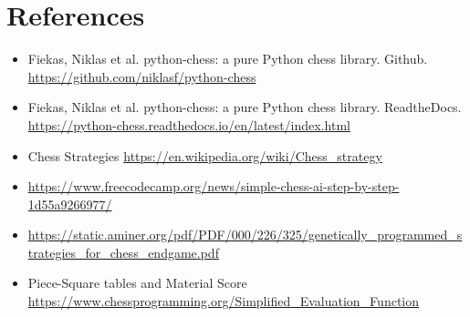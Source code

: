 \documentclass[12pt]{article}
\begin{document}
\section{References}
\label{References}
\begin{itemize}
\item Fiekas, Niklas et al. python-chess: a pure Python chess library. Github.
\url{https://github.com/niklasf/python-chess}

\item Fiekas, Niklas et al. python-chess: a pure Python chess library. ReadtheDocs.
\url{https://python-chess.readthedocs.io/en/latest/index.html }

\item Chess Strategies \url{https://en.wikipedia.org/wiki/Chess_strategy}

\item \url{https://www.freecodecamp.org/news/simple-chess-ai-step-by-step-1d55a9266977/}
\item \url{https://static.aminer.org/pdf/PDF/000/226/325/genetically_programmed_strategies_for_chess_endgame.pdf}

\item Piece-Square tables and Material Score
\url{https://www.chessprogramming.org/Simplified_Evaluation_Function}
\end{itemize}
\end{document}
